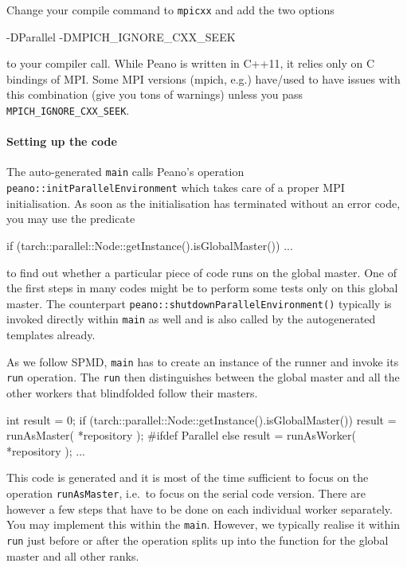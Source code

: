 Change your compile command to \texttt{mpicxx} and add the two options
\begin{code}
  -DParallel -DMPICH_IGNORE_CXX_SEEK
\end{code}
to your compiler call.
While Peano is written in C++11, it relies only on C bindings of MPI.
Some MPI versions (mpich, e.g.) have/used to have issues with this combination
(give you tons of warnings) unless you pass \texttt{MPICH\_IGNORE\_CXX\_SEEK}. 


\paragraph{Setting up the code}

The auto-generated \texttt{main} calls Peano's operation \newline
\texttt{peano::initParallelEnvironment} which takes care of a proper MPI
initialisation. 
As soon as the initialisation has terminated without an error code, you may use
the predicate

\begin{code}
if (tarch::parallel::Node::getInstance().isGlobalMaster()) {
  ...
}
\end{code}

\noindent
to find out whether a particular piece of code runs on the global master. 
One of the first steps in many codes might be to perform some tests only on this
global master.
The counterpart \linebreak
\texttt{peano::shutdownParallelEnvironment()} typically is
invoked directly within \texttt{main} as well and is also called by the
autogenerated templates already.

As we follow SPMD, \texttt{main} has to create an instance of the runner and
invoke its \texttt{run} operation. 
The \texttt{run} then distinguishes between the global master and all the other
workers that blindfolded follow their masters. 
\begin{code}
  int result = 0;
  if (tarch::parallel::Node::getInstance().isGlobalMaster()) {
    result = runAsMaster( *repository );
  }
  #ifdef Parallel
  else {
    result = runAsWorker( *repository );
  }
  ...
\end{code}

\noindent
This code is generated and it is most of the time sufficient to focus on the
operation \texttt{runAsMaster}, i.e.~to focus on the serial code version. There
are however a few steps that have to be done on each individual worker
separately. 
You may implement this within the \texttt{main}.
However, we typically realise it within \texttt{run} just before or after the
operation splits up into the function for the global master and all other ranks.


